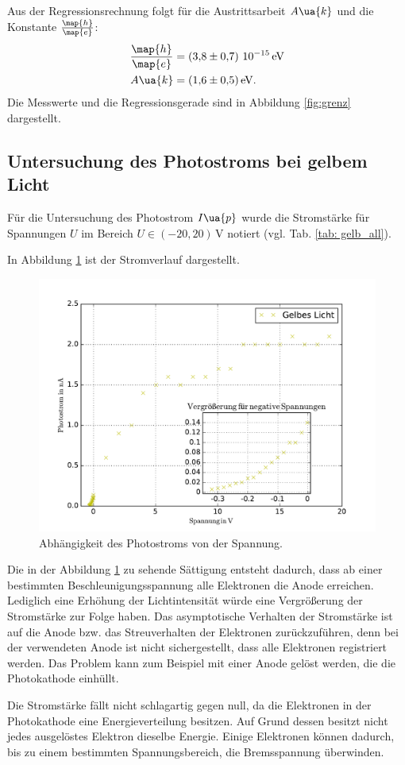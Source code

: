 Aus der Regressionsrechnung folgt für die Austrittsarbeit $A\ua{k}$ und die
Konstante $\frac{\map{h}}{\map{e}}$:
\begin{align}
  \label{eq:messergebnisse}
  \begin{aligned}
  \frac{\map{h}}{\map{e}}&= \left(\num{3.8\pm 0.7}\right)\,\num{e-15}\,\si{\eV} \\
  A\ua{k}&=\SI{1.6\pm 0.5}{\eV}.
  \end{aligned}
\end{align}
Die Messwerte und die Regressionsgerade sind in Abbildung \ref{fig:grenz} dargestellt.
\FloatBarrier
\subsection{Untersuchung des Photostroms bei gelbem Licht}
\FloatBarrier
Für die Untersuchung des Photostrom $I\ua{p}$ wurde die
Stromstärke für Spannungen $U$ im Bereich $U\in\left(-20,20\right)\,\si{\volt}$
notiert (vgl. Tab. \ref{tab: gelb_all}).

In Abbildung \ref{fig:gelb_all} ist der Stromverlauf dargestellt.
\begin{figure}
    \centering
    \includegraphics[width=1 \textwidth]{../Messdaten/gelb.pdf}
    \caption{Abhängigkeit des Photostroms von der Spannung.}
    \label{fig:gelb_all}
  \end{figure}

Die in der Abbildung \ref{fig:gelb_all} zu sehende Sättigung entsteht dadurch, dass
ab einer bestimmten Beschleunigungsspannung alle Elektronen die Anode erreichen.
Lediglich eine Erhöhung der Lichtintensität würde eine Vergrößerung der Stromstärke
zur Folge haben. %
Das asymptotische Verhalten der Stromstärke ist auf die Anode
bzw. das Streuverhalten der Elektronen zurückzuführen, denn bei der verwendeten %
Anode ist nicht sichergestellt, dass alle Elektronen registriert werden. %
Das Problem kann zum Beispiel mit einer Anode gelöst werden, die die Photokathode
einhüllt.

Die Stromstärke fällt nicht schlagartig gegen null, da die Elektronen in der Photokathode
eine Energieverteilung besitzen. Auf Grund dessen besitzt nicht jedes ausgelöstes
Elektron dieselbe Energie. Einige Elektronen können dadurch, bis zu einem bestimmten Spannungsbereich,
die Bremsspannung überwinden.
\FloatBarrier
